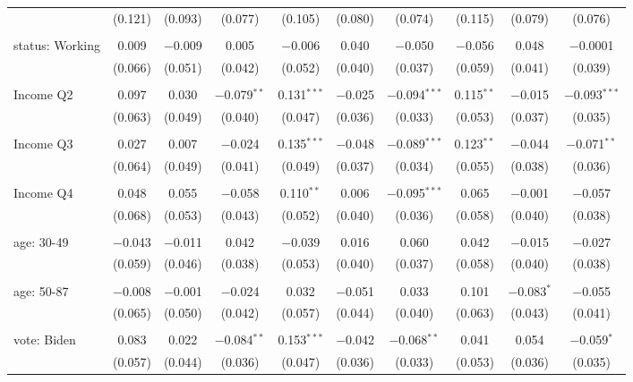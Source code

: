 \begin{tabular}{@{\extracolsep{5pt}}lccccccccc}
  & (0.121) & (0.093) & (0.077) & (0.105) & (0.080) & (0.074) & (0.115) & (0.079) & (0.076) \\ 
  & & & & & & & & & \\ 
 status: Working & 0.009 & $-$0.009 & 0.005 & $-$0.006 & 0.040 & $-$0.050 & $-$0.056 & 0.048 & $-$0.0001 \\ 
  & (0.066) & (0.051) & (0.042) & (0.052) & (0.040) & (0.037) & (0.059) & (0.041) & (0.039) \\ 
  & & & & & & & & & \\ 
 Income Q2 & 0.097 & 0.030 & $-$0.079$^{**}$ & 0.131$^{***}$ & $-$0.025 & $-$0.094$^{***}$ & 0.115$^{**}$ & $-$0.015 & $-$0.093$^{***}$ \\ 
  & (0.063) & (0.049) & (0.040) & (0.047) & (0.036) & (0.033) & (0.053) & (0.037) & (0.035) \\ 
  & & & & & & & & & \\ 
 Income Q3 & 0.027 & 0.007 & $-$0.024 & 0.135$^{***}$ & $-$0.048 & $-$0.089$^{***}$ & 0.123$^{**}$ & $-$0.044 & $-$0.071$^{**}$ \\ 
  & (0.064) & (0.049) & (0.041) & (0.049) & (0.037) & (0.034) & (0.055) & (0.038) & (0.036) \\ 
  & & & & & & & & & \\ 
 Income Q4 & 0.048 & 0.055 & $-$0.058 & 0.110$^{**}$ & 0.006 & $-$0.095$^{***}$ & 0.065 & $-$0.001 & $-$0.057 \\ 
  & (0.068) & (0.053) & (0.043) & (0.052) & (0.040) & (0.036) & (0.058) & (0.040) & (0.038) \\ 
  & & & & & & & & & \\ 
 age: 30-49 & $-$0.043 & $-$0.011 & 0.042 & $-$0.039 & 0.016 & 0.060 & 0.042 & $-$0.015 & $-$0.027 \\ 
  & (0.059) & (0.046) & (0.038) & (0.053) & (0.040) & (0.037) & (0.058) & (0.040) & (0.038) \\ 
  & & & & & & & & & \\ 
 age: 50-87 & $-$0.008 & $-$0.001 & $-$0.024 & 0.032 & $-$0.051 & 0.033 & 0.101 & $-$0.083$^{*}$ & $-$0.055 \\ 
  & (0.065) & (0.050) & (0.042) & (0.057) & (0.044) & (0.040) & (0.063) & (0.043) & (0.041) \\ 
  & & & & & & & & & \\ 
 vote: Biden & 0.083 & 0.022 & $-$0.084$^{**}$ & 0.153$^{***}$ & $-$0.042 & $-$0.068$^{**}$ & 0.041 & 0.054 & $-$0.059$^{*}$ \\ 
  & (0.057) & (0.044) & (0.036) & (0.047) & (0.036) & (0.033) & (0.053) & (0.036) & (0.035) \\ 

\end{tabular}
